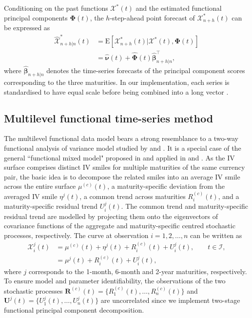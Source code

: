 \documentclass[12pt,a4paper]{article}
\newcommand{\X}{\mathcal{X}}
\begin{document}
Conditioning on the past functions $\bm{\X}^*(t)$ and the estimated functional principal components $\bm{\Phi}(t)$, the $h$-step-ahead point forecast of $\bm{\X}_{n+h}^*(t)$ can be expressed as
\begin{align*}
\widehat{\bm{\X}}^*_{n+h|n}(t) &= \text{E}\left[\bm{\X}^*_{n+h}(t)|\bm{\X}^*(t), \bm{\Phi}(t)\right] \\
&= \widehat{\bm{\nu}}(t) + \widehat{\bm{\Phi}}(t)\bm{\widehat{\beta}}_{n+h|n}^{\top},
\end{align*}
where $\widehat{\bm{\beta}}_{n+h|n}$ denotes the time-series forecasts of the principal component scores corresponding to the three maturities. In our implementation, each series is standardised to have equal scale before being combined into a long vector \citep[see, e.g.,][]{CCY14}.

\subsection{Multilevel functional time-series method}\label{sec:multilevel}

The multilevel functional data model bears a strong resemblance to a two-way functional analysis of variance model studied by \cite{MVB+03} and \cite{CF10}. It is a special case of the general ``functional mixed model" proposed in \cite{MC06} and applied in \cite{Shang16} and \cite{SSB+16}. As the IV surface comprises distinct IV smiles for multiple maturities of the same currency pair, the basic idea is to decompose the related smiles into an average IV smile across the entire surface $\mu^{(c)}(t)$, a maturity-specific deviation from the averaged IV smile $\eta^j(t)$, a common trend across maturities $R^{(c)}_i(t)$, and a maturity-specific residual trend $U_i^j(t)$. The common trend and maturity-specific residual trend are modelled by projecting them onto the eigenvectors of covariance functions of the aggregate and maturity-specific centred stochastic processes, respectively. The curve at observation $i=1,2,\dots,n$ can be written as
\begin{align}
\X_i^j(t) &= \mu^{(c)}(t) + \eta^j(t) + R_i^{(c)}(t) + U_i^j(t),\qquad t\in \mathcal{I}, \label{eq:4}\\
&= \mu^j(t) + R_i^{(c)}(t) + U_i^j(t), \label{eq:5}
\end{align}
where $j$ corresponds to the 1-month, 6-month and 2-year maturities, respectively. To ensure model and parameter identifiability, the observations of the two stochastic processes $\bm{R}^{(c)}(t) = \big\{R_1^{(c)}(t),\dots,R_n^{(c)}(t)\big\}$ and $\bm{U}^j(t) =\big\{U_1^j(t), \dots, U_n^j(t)\big\}$ are uncorrelated since we implement two-stage functional principal component decomposition. 
\end{document}
